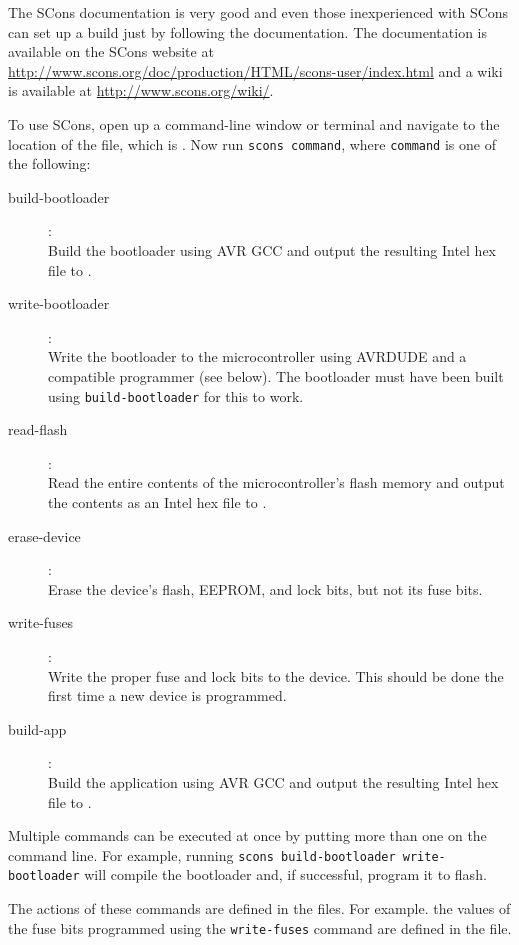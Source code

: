 \documentclass{article}
\newcommand{\abrackets}[1]{\textlangle #1\textrangle}
\begin{document}
The SCons documentation is very good and even those inexperienced with SCons can set up a build just
by following the documentation.  The documentation is available on the SCons website at
\url{http://www.scons.org/doc/production/HTML/scons-user/index.html} and a wiki is available at
\url{http://www.scons.org/wiki/}.

To use SCons, open up a command-line window or terminal and navigate to the location of the
 file, which is .  Now run \texttt{scons \abrackets{command}},
where \texttt{\abrackets{command}} is one of the following:

\begin{description}
  \item[build-bootloader]: \\
    Build the bootloader using AVR GCC and output the resulting Intel hex file to
    .
  \item[write-bootloader]: \\
    Write the bootloader to the microcontroller using AVRDUDE and a compatible programmer (see
    below).  The bootloader must have been built using \texttt{build-bootloader} for this to work.
  \item[read-flash]: \\
    Read the entire contents of the microcontroller's flash memory and output the contents as an
    Intel hex file to .
  \item[erase-device]: \\
    Erase the device's flash, EEPROM, and lock bits, but not its fuse bits.
  \item[write-fuses]: \\
    Write the proper fuse and lock bits to the device.  This should be done the first time a new
    device is programmed.
  \item[build-app]: \\
    Build the application using AVR GCC and output the resulting Intel hex file to
    .
\end{description}

Multiple commands can be executed at once by putting more than one on the command line.  For
example, running \texttt{scons build-bootloader write-bootloader} will compile the bootloader and,
if successful, program it to flash.

The actions of these commands are defined in the  files.  For example. the values
of the fuse bits programmed using the \texttt{write-fuses} command are defined in the
 file.
\end{document}
